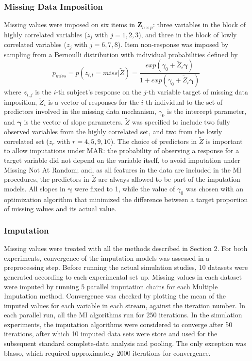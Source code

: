 \subsubsection{Missing Data Imposition} \label{sub_missing}

	Missing values were imposed on six items in $\bm{Z}_{n \times p}$: three variables in the block of
	highly correlated variables ($z_j$ with $j = 1,2,3$), and three in the block of lowly correlated variables ($z_j$ 
	with $j = 6,7,8$).
	Item non-response was imposed by sampling from a Bernoulli distribution with individual probabilities defined by 
%
	\begin{equation} \label{eqn:rm}
		p_{miss} = p(z_{i,t} = miss | \tilde{Z}) = \frac{ exp(\gamma_0 + \tilde{Z}_{i}\bm{\gamma}) }
								{ 1 + exp(\gamma_0 + \tilde{Z}_{i}\bm{\gamma}) }
	\end{equation}
%
	where $z_{i,j}$ is the $i$-th subject's response on the $j$-th variable target of missing data imposition, 
	$\tilde{Z}_{i}$ is a vector of responses for the $i$-th individual to the set of predictors involved in 
	the missing data mechanism, $\gamma_0$ is the intercept parameter, and $\bm{\gamma}$ is the vector of slope 
	parameters.
	$\tilde{Z}$ was specified to include two fully observed variables from the highly correlated set, and two 
	from the lowly correlated set ($z_r$ with $r = 4,5,9,10$).	
	The choice of predictors in $\tilde{Z}$ is important to allow imputations under MAR: 
	the probability of observing a response for a target variable did not depend on the variable itself, 
	to avoid imputation under Missing Not At Random; and, as all features in the data are included in the MI 
	procedures, the predictors in $\tilde{Z}$ are always allowed to be part of the imputation models.
	All slopes in $\bm{\gamma}$ were fixed to 1, while the value of $\gamma_0$ was chosen with an optimization algorithm that 
	minimized the difference between a target proportion of missing values and its actual value.

\subsubsection{Imputation}
	
	Missing values were treated with all the methods described in Section 2.
	For both experiments, convergence of the imputation models was assessed in a preprocessing step.
	Before running the actual simulation studies, 10 datasets were generated according to each experimental set up.
	Missing values in each dataset were imputed by running 5 parallel imputation chains for each Multiple Imputation 
	method.
	Convergence was checked by plotting the mean of the imputed values for each variable in each stream, against the 
	iteration number.
	In each parallel run, all the MI algorithms run for 250 iterations.
	In the simulation experiments, the imputation algorithms were considered to converge after 50 iterations, 
	after which 10 imputed data sets were store and used for the subsequent standard complete-data analysis and 
	pooling.
	The only exception was blasso, which required approximately 2000 iterations for convergence.


